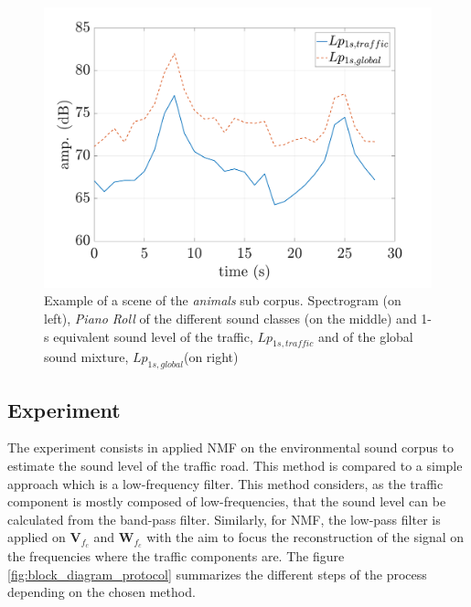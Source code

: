 \documentclass[twocolumn,a4paper,10pt]{article}
\begin{document}
\begin{figure}
\begin{minipage}[c]{.32\linewidth}
      \includegraphics[width =\linewidth]{../image/evolutionLpExample.pdf} 

   \end{minipage}
\caption{Example of a scene of the \textit{animals} sub corpus. Spectrogram (on left), \textit{Piano Roll} of the different sound classes (on the middle) and 1-s equivalent sound level of the traffic, $Lp_{1s,traffic}$ and of the global sound mixture, $Lp_{1s,global}$(on right)}
\label{fig:exampleScene}
\end{figure}

\subsection{Experiment}

The experiment consists in applied NMF on the environmental sound corpus to estimate the sound level of the traffic road. This method is compared to a simple approach which is a low-frequency filter. This method considers, as the traffic component is mostly composed of low-frequencies, that the sound level can be calculated from the band-pass filter. Similarly, for NMF, the low-pass filter is applied on $\mathbf{V}_{f_c}$ and $\mathbf{W}_{f_c}$ with the aim to focus the reconstruction of the signal on the frequencies where the traffic components are. The figure \ref{fig:block_diagram_protocol} summarizes the different steps of the process depending on the chosen method.\\
\end{document}
